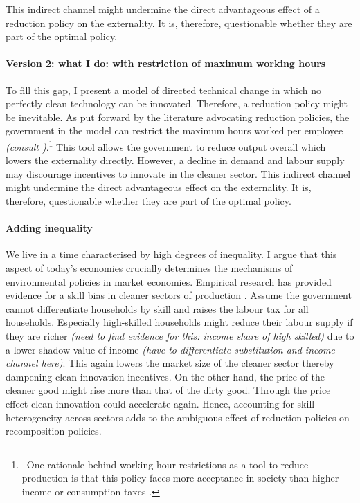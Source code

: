 \documentclass[12pt]{article}
\begin{document}
 This indirect channel might undermine the direct advantageous effect of a reduction policy on the externality. It is, therefore, questionable whether they are part of the optimal policy.

\paragraph{Version 2: what I do: with restriction of maximum working hours}
To fill this gap, I present a model of directed technical change in which no perfectly clean technology can be innovated. Therefore, a reduction policy might be inevitable. As put forward by the literature advocating reduction policies, the government in the model can restrict the maximum hours worked per employee \textit{(consult \cite{Schor2005SustainableReduction})}.\footnote{\ One rationale behind working hour restrictions as a tool to reduce production is that this policy faces more acceptance in society than higher income or consumption taxes \citep[e.g.][]{Schor2005SustainableReduction, Alvarez-Cuadrado2007EnvyHours}.}
This tool allows the government to reduce output overall which lowers the externality directly.
However, a decline in demand and labour supply may discourage incentives to innovate in the cleaner sector. This indirect channel might undermine the direct advantageous effect on the externality. It is, therefore, questionable whether they are part of the optimal policy.

\paragraph{Adding inequality}
We live in a time characterised by high degrees of inequality. I argue that this aspect of today's economies crucially determines the mechanisms of environmental policies in market economies. Empirical research has provided evidence for a skill bias in cleaner sectors of production \citep{Consoli2016DoCapital}. Assume the government cannot differentiate households by skill and raises the labour tax for all households. Especially high-skilled households might reduce their labour supply if they are richer \textit{(need to find evidence for this: income share of high skilled)} due to a lower shadow value of income \textit{(have to differentiate substitution and income channel here)}. This again lowers the market size of the cleaner sector thereby dampening clean innovation incentives. On the other hand, the price of the cleaner good might rise more than that of the dirty good. Through the price effect clean innovation could accelerate again. Hence, accounting for skill heterogeneity across sectors adds to the ambiguous effect of reduction policies on recomposition policies.
\end{document}

